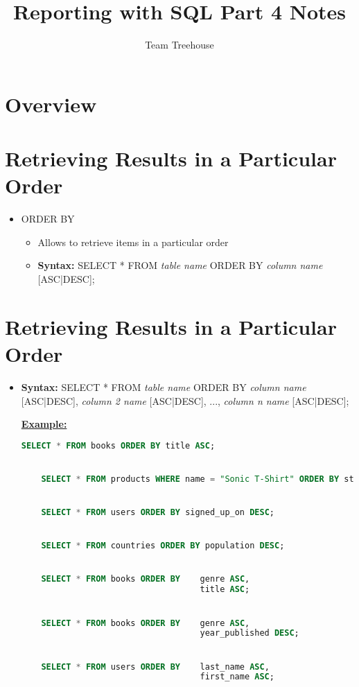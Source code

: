 \documentclass[12pt]{article}
\begin{document}
\title{Reporting with SQL Part 4 Notes}
\author{Team Treehouse}
\maketitle

\bigskip

\section{Overview}

\bigskip

\section{Retrieving Results in a Particular Order}

\bigskip

\begin{itemize}
    \item ORDER BY
    \begin{itemize}
        \item Allows to retrieve items in a particular order
        \item \textbf{Syntax:} SELECT * FROM \textit{table name} ORDER BY \textit{column name} [ASC|DESC];
    \end{itemize}
\end{itemize}

\bigskip

\section{Retrieving Results in a Particular Order}

\bigskip

\begin{itemize}
    \item \textbf{Syntax:} SELECT * FROM \textit{table name} ORDER BY \textit{column name} [ASC|DESC], \textit{column 2 name} [ASC|DESC], ..., \textit{column n name} [ASC|DESC];

    \bigskip

    \underline{\textbf{Example:}}

    \bigskip

    \begin{lstlisting}[language=SQL]
    SELECT * FROM books ORDER BY title ASC;


    SELECT * FROM products WHERE name = "Sonic T-Shirt" ORDER BY stock_count DESC;


    SELECT * FROM users ORDER BY signed_up_on DESC;


    SELECT * FROM countries ORDER BY population DESC;


    SELECT * FROM books ORDER BY    genre ASC,
                                    title ASC;


    SELECT * FROM books ORDER BY    genre ASC,
                                    year_published DESC;


    SELECT * FROM users ORDER BY    last_name ASC,
                                    first_name ASC;
    \end{lstlisting}
\end{itemize}
\end{document}

